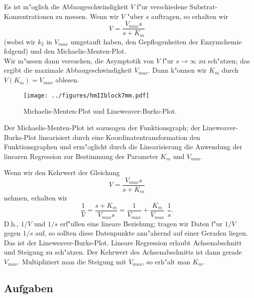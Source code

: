 Es ist m"oglich die Abbaugeschwindigkeit $V$ f"ur verschiedene Substrat-Konzentrationen 
zu messen. Wenn wir $V$ "uber $s$ auftragen, so erhalten wir 
$$ V = \frac{V_{max} s}{s+K_m}$$
(wobei wir $k_2$ in $V_{max}$ umgetauft haben, den Gepflogenheiten der Enzymchemie folgend)
und den Michaelis-Menten-Plot.\\
Wir m"ussen dann versuchen, die Asymptotik von $V$ 
f"ur $s\rightarrow\infty$ zu sch"atzen; 
das ergibt die maximale Abbaugeschwindigkeit $V_{max}$. Dann k"onnen
wir $K_m$ durch $V(K_m)=V_{max}$ ablesen.
\begin{figure}[htbp] %
   \centering
   \texttt{[image: ../figures/hmIIblock7mm.pdf]}
   \caption{Michaelis-Menten-Plot und Lineweaver-Burks-Plot.}
   \label{rk:mm:sing}
\end{figure}
Der Michaelis-Menten-Plot ist sozusagen der Funktionsgraph; der Lineweaver-Burks-Plot
linearisiert durch eine Koordinatentransformation den Funktionsgraphen und erm"oglicht
durch die Linearisierung die Anwendung der linearen Regression zur Bestimmung
der Parameter $K_m$ und $V_{max}$.

 Wenn wir den Kehrwert der Gleichung
$$ V = \frac{V_{max} s}{s+K_m}$$
nehmen, erhalten wir
$$ \frac 1 V = \frac{s+K_m}{V_{max} s} = \frac 1 {V_{max}} + \frac{K_m}{V_{max}}\,\, \frac 1 s.$$
D.h., $1/V$ und $1/s$ erf"ullen eine lineare Beziehung; tragen wir Daten f"ur $1/V$ gegen $1/s$ auf, so sollten
diese Datenpunkte ann"ahernd auf einer Geraden liegen. Das ist der 
 Lineweaver-Burks-Plot. 
Lineare Regression erlaubt Achsenabschnitt und
Steigung zu sch"atzen. Der Kehrwert des Achsenabschnitts ist dann gerade $V_{max}$. Multipliziert man die Steigung
mit $V_{max}$, so erh"alt man $K_m$.

\subsection*{Aufgaben}
\begin{auf}\cha\label{block7A1}

\end{auf}

